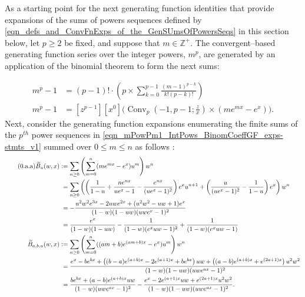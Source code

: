 \documentclass[12pt,reqno]{article}
\renewenvironment{subequations}{%
  \refstepcounter{equation}%
  \edef\theparentequation{\theequation}%
  \setcounter{parentequation}{\value{equation}}%
  \setcounter{equation}{0}%
  \def\theequation{\theparentequation.\alph{equation}}%
  \ignorespaces
}{%
  \setcounter{equation}{\value{parentequation}}%
  \ignorespacesafterend
}
\numberwithin{sfootnote}{section}
\numberwithin{equation}{section}
\newcommand{\tagonce}[0]{
     \addtocounter{equation}{1}
     \tag{\theequation}
}
\theoremstyle{DefaultTheoremStyle}
\theoremstyle{definition}
\newcommand{\cf}[0]{cf.\ }
\newcommand{\defequals}{\ensuremath{\vcentcolon=}}
\newcommand{\StartGroupingSubEquations}{\begin{subequations}}
\newcommand{\EndGroupingSubEquations}{\end{subequations}}
\newcommand{\ConvGF}[4]{\ensuremath{\Conv_{#1}\left(#2, #3; #4\right)}}
\DeclareMathOperator{\Conv}{Conv}
\begin{document}
As a starting point for the next generating function identities 
that provide expansions of the sums of powers 
sequences defined by 
\eqref{eqn_defs_and_ConvFnExps_of_the_GenSUmsOfPowersSeqs} 
in this section below, 
let $p \geq 2$ be fixed, and 
suppose that $m \in \mathbb{Z}^{+}$. 
The convergent--based generating function 
series over the integer powers, $m^{p}$, 
are generated by an application of the binomial theorem to 
form the next sums: 
\StartGroupingSubEquations 
\begin{align} 
\label{eqn_mPowPm1_IntPows_BinomCoeffGF_exps-stmts_v1} 
m^{p} - 1 & = 
     (p-1)! \cdot \left( 
     p \times \sum_{k=0}^{p-1} \frac{(m-1)^{p-k}}{k! (p-k)!} 
     \right) \\ 
\label{eqn_mPowPm1_IntPows_BinomCoeffGF_exps-stmts_v2} 
m^{p} - 1 & = 
     [z^{p-1}] [x^0] \Biggl( 
     \ConvGF{p}{-1}{p-1}{\frac{z}{x}} \times (m e^{mx} - e^{x}) 
     \Biggr). 
\end{align} 
\EndGroupingSubEquations 
Next, consider the generating function expansions 
enumerating the finite sums of the $p^{th}$ power sequences in 
\eqref{eqn_mPowPm1_IntPows_BinomCoeffGF_exps-stmts_v1} summed over 
$0 \leq m \leq n$ as follows \citep[\cf \S 7.6]{GKP}: 
\begin{align*} 
\tagonce\label{eqn_Spn_Conv_and_BNumGF_ident_ex-stmt_v2} 
\widetilde{B}_u(w, x) & \defequals 
     \sum_{n \geq 0} \left( 
     \sum_{m=0}^{n} (me^{mx}-e^{x}) u^{m} 
     \right) w^{n} \\ 
     & \phantom{:} = 
     \sum_{n \geq 0} \left( 
     \left(\frac{1}{1-u} + \frac{n e^{nx}}{u e^{x} - 1} - 
     \frac{e^{nx}}{(u e^{x} - 1)^2}\right) e^{x} u^{n+1} + 
     \left(\frac{u}{(u e^{x} - 1)^2} - \frac{1}{1-u}\right) e^{x} 
     \right) w^{n} \\ 
     & \phantom{:} = 
     -\frac{u^2w^2 e^{3x} - 2 uw e^{2x} + (u^2w^2 -uw + 1) e^{x}}{ 
     (1-w) (1-uw) (uw e^{x} - 1)^2} \\ 
     & \phantom{:} = 
     \frac{e^{x}}{(1-w)(1-uw)} - 
     \frac{1}{(1-w) (e^{x} uw-1)^{2}} + 
     \frac{1}{(1-w) (e^{x} uw - 1)} \\ 
\widetilde{B}_{a,b,u}(w, x) & \defequals 
     \sum_{n \geq 0} \left( 
     \sum_{m=0}^{n} ((am+b) e^{(am+b) x}-e^{x}) u^{m} 
     \right) w^{n} \\ 
     & \phantom{:} = 
     \frac{e^{x} - be^{bx} + 
     \left((b-a)e^{(a+b)x} - 2 e^{(a+1)x} + be^{bx}\right) uw + 
     \left((a-b)e^{(a+b)x} + e^{(2a+1)x} \right) u^{2} w^{2}}{ 
     (1-w) (1-uw) (uw e^{ax} - 1)^2} \\ 
     & \phantom{:} = 
     \frac{be^{bx} + (a-b) e^{(a+b) x} uw}{(1-w) (uw e^{ax}-1)^{2}} - 
     \frac{e^{x} - 2 e^{(a+1) x} uw + e^{(2a+1) x} u^2 w^2}{ 
     (1-w) (1-uw) (uw e^{ax}-1)^{2}}. 
\end{align*} 
\end{document}
